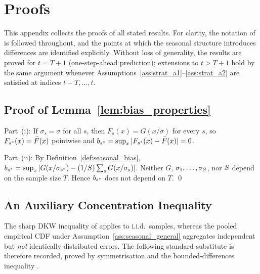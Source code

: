 \section{Proofs}
\label{app:proofs}

This appendix collects the proofs of all stated results.  For
clarity, the notation of \citet{xu2023conformal} is followed
throughout, and the points at which the seasonal structure
introduces differences are identified explicitly.  Without loss of
generality, the results are proved for $t = T+1$ (one-step-ahead
prediction); extensions to $t > T+1$ hold by the same argument
whenever Assumptions~\ref{ass:strat_a1}--\ref{ass:strat_a2}
are satisfied at indices $t-T, \ldots, t$.

\subsection{Proof of Lemma~\ref{lem:bias_properties}}
\label{app:proofs:lemma_bias}

Part~(i): If $\sigma_s = \sigma$ for all $s$, then
$F_s(x) = G(x/\sigma)$ for every $s$, so
$F_{s^*}(x) = \bar{F}(x)$ pointwise and
$b_{s^*} = \sup_x|F_{s^*}(x) - \bar{F}(x)| = 0$.

Part~(ii): By Definition~\ref{def:seasonal_bias},
$b_{s^*} = \sup_x|G(x/\sigma_{s^*}) - (1/S)\sum_s G(x/\sigma_s)|$.
Neither $G$, $\sigma_1,\ldots,\sigma_S$, nor $S$ depend on
the sample size $T$.  Hence $b_{s^*}$ does not depend on $T$.
\qed

\subsection{An Auxiliary Concentration Inequality}
\label{app:proofs:dkw_noniid}

The sharp DKW inequality of \citet{massart1990tight} applies to
i.i.d.\ samples, whereas the pooled empirical CDF under
Assumption~\ref{ass:seasonal_general} aggregates independent but
\emph{not} identically distributed errors.  The following standard
substitute is therefore recorded, proved by symmetrisation and the
bounded-differences inequality
\citep{boucheron2013concentration}.

